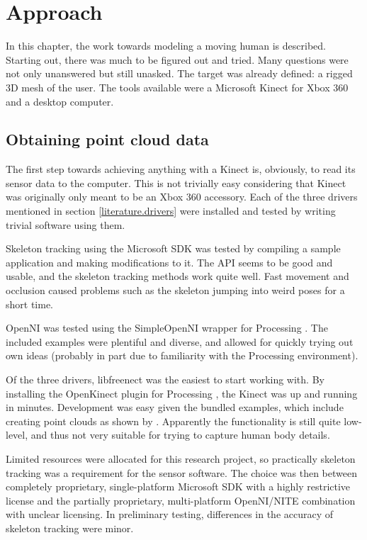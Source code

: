 \chapter{Approach}

In this chapter, the work towards modeling a moving human is described. Starting out, there was much to be figured out and tried. Many questions were not only unanswered but still unasked. The target was already defined: a rigged 3D mesh of the user. The tools available were a Microsoft Kinect for Xbox 360 and a desktop computer.

\section{Obtaining point cloud data}

The first step towards achieving anything with a Kinect is, obviously, to read its sensor data to the computer. This is not trivially easy considering that Kinect was originally only meant to be an Xbox 360 accessory. Each of the three drivers mentioned in section \ref{literature.drivers} were installed and tested by writing trivial software using them.

Skeleton tracking using the Microsoft SDK was tested by compiling a sample application and making modifications to it. The API seems to be good and usable, and the skeleton tracking methods work quite well. Fast movement and occlusion caused problems such as the skeleton jumping into weird poses for a short time.

OpenNI was tested using the SimpleOpenNI \citep{simpleopenni} wrapper for Processing \citep{processing}. The included examples were plentiful and diverse, and allowed for quickly trying out own ideas (probably in part due to familiarity with the Processing environment).

Of the three drivers, libfreenect was the easiest to start working with. By installing the OpenKinect plugin for Processing \citep{shiffman2010} \citep{processing}, the Kinect was up and running in minutes. Development was easy given the bundled examples, which include creating point clouds as shown by \citet{fisher2010}. Apparently the functionality is still quite low-level, and thus not very suitable for trying to capture human body details.

Limited resources were allocated for this research project, so practically skeleton tracking was a requirement for the sensor software. The choice was then between completely proprietary, single-platform Microsoft SDK with a highly restrictive license and the partially proprietary, multi-platform OpenNI/NITE combination with unclear licensing. In preliminary testing, differences in the accuracy of skeleton tracking were minor.

